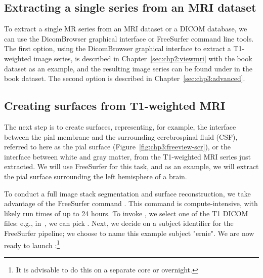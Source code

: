 \subsection{Extracting a single series from an MRI dataset}

To extract a single MR series from an MRI dataset or a DICOM database,
we can use the DicomBrowser graphical interface or FreeSurfer command
line tools. The first option, using the DicomBrowser graphical
interface to extract a T1-weighted image series, is described in
Chapter~\ref{sec:chp2:viewmri} with the book dataset as an example,
and the resulting image series can be found under  in
the book dataset. The second option is described in
Chapter~\ref{sec:chp3:advanced}.

\subsection{Creating surfaces from T1-weighted MRI}
\label{sec:chp3:surfaces}


The next step is to create surfaces, representing, for example, the
interface between the pial membrane and the surrounding cerebrospinal
fluid (CSF), referred to here as the pial surface 
(Figure~\ref{fig:chp3:freeview-scr}), or the interface
between white and gray matter, from the T1-weighted MRI series just
extracted. We will use FreeSurfer for this task, and as an example, we
will extract the pial surface surrounding the left hemisphere of a
brain.

To conduct a full image stack segmentation and surface reconstruction,
we take advantage of the FreeSurfer command . This
command is compute-intensive, with likely run times of up to 24
hours. To invoke , we select one of the T1 DICOM files:
e.g., in~, we can pick . Next, we
decide on a subject identifier for the FreeSurfer pipeline; we choose
to name this example subject "ernie". We are now ready to launch
:\footnote{It is advisable to do this on a separate
  core or overnight.}


